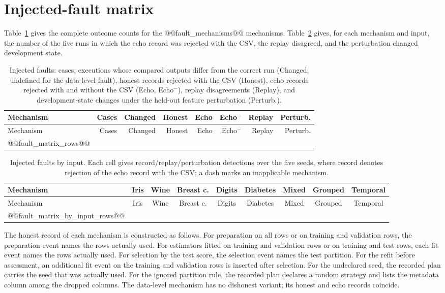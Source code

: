 \documentclass[11pt,letterpaper]{article}
\begin{document}
\section{Injected-fault matrix}
Table~\ref{tab:faultfull} gives the complete outcome counts for the @@fault_mechanisms@@ mechanisms. Table~\ref{tab:faultinput} gives, for each mechanism and input, the number of the five runs in which the echo record was rejected with the CSV, the replay disagreed, and the perturbation changed development state.

\begin{longtable}{p{}rrrrrrr}
\caption{Injected faults: cases, executions whose compared outputs differ from the correct run (Changed; undefined for the data-level fault), honest records rejected with the CSV (Honest), echo records rejected with and without the CSV (Echo, Echo$^{-}$), replay disagreements (Replay), and development-state changes under the held-out feature perturbation (Perturb.).}\label{tab:faultfull}\\
\toprule Mechanism & Cases & Changed & Honest & Echo & Echo$^{-}$ & Replay & Perturb.\\\midrule\endfirsthead
\toprule Mechanism & Cases & Changed & Honest & Echo & Echo$^{-}$ & Replay & Perturb.\\\midrule\endhead
@@fault_matrix_rows@@
\bottomrule
\end{longtable}

\setlength{\tabcolsep}{3.5pt}
\begin{longtable}{p{}cccccccc}
\caption{Injected faults by input. Each cell gives record/replay/perturbation detections over the five seeds, where record denotes rejection of the echo record with the CSV; a dash marks an inapplicable mechanism.}\label{tab:faultinput}\\
\toprule Mechanism & Iris & Wine & Breast c. & Digits & Diabetes & Mixed & Grouped & Temporal\\\midrule\endfirsthead
\toprule Mechanism & Iris & Wine & Breast c. & Digits & Diabetes & Mixed & Grouped & Temporal\\\midrule\endhead
@@fault_matrix_by_input_rows@@
\bottomrule
\end{longtable}

The honest record of each mechanism is constructed as follows. For preparation on all rows or on training and validation rows, the preparation event names the rows actually used. For estimators fitted on training and validation rows or on training and test rows, each fit event names the rows actually used. For selection by the test score, the selection event names the test partition. For the refit before assessment, an additional fit event on the training and validation rows is inserted after selection. For the undeclared seed, the recorded plan carries the seed that was actually used. For the ignored partition rule, the recorded plan declares a random strategy and lists the metadata column among the dropped columns. The data-level mechanism has no dishonest variant; its honest and echo records coincide.
\end{document}
